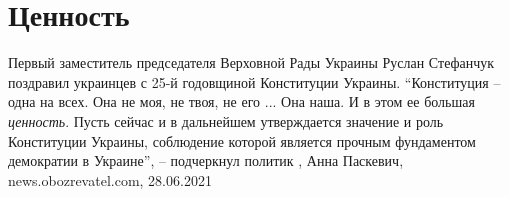  
 
 
 
 
\chapter{Ценность}

Первый заместитель председателя Верховной Рады Украины Руслан Стефанчук
поздравил украинцев с 25-й годовщиной Конституции Украины. \enquote{Конституция – одна
на всех. Она не моя, не твоя, не его ... Она наша. И в этом ее большая
\emph{ценность}. Пусть сейчас и в дальнейшем утверждается значение и роль Конституции
Украины, соблюдение которой является прочным фундаментом демократии в Украине},
– подчеркнул политик
, 
Анна Паскевич, news.obozrevatel.com, 28.06.2021

